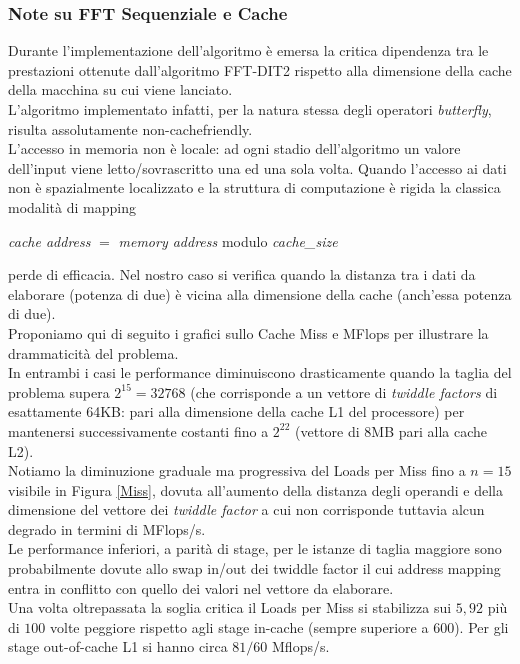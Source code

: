 \documentclass[12pt,a4paper,oneside,openright]{article}
\begin{document}
\subsubsection{Note su FFT Sequenziale e Cache}
Durante l'implementazione dell'algoritmo è emersa la critica dipendenza tra le prestazioni ottenute dall'algoritmo FFT-DIT2 rispetto alla dimensione della cache della macchina su cui viene lanciato.\\
L'algoritmo implementato infatti, per la natura stessa degli operatori \emph{butterfly}, risulta assolutamente non-cachefriendly.\\
L'accesso in memoria non è locale: ad ogni stadio dell'algoritmo un valore dell'input viene letto/sovrascritto una ed una sola volta. Quando l'accesso ai dati non è spazialmente localizzato e la struttura di computazione è rigida la classica modalità di mapping
\begin{center}
\emph{cache address} $=$ \emph{memory address} modulo \emph{cache\_size} 
\end{center}
perde di efficacia. Nel nostro caso si verifica quando la distanza tra i dati da elaborare (potenza di due) è vicina alla dimensione della cache (anch'essa potenza di due).\\
Proponiamo qui di seguito i grafici sullo Cache Miss e MFlops per illustrare la drammaticità del problema.\\
In entrambi i casi le performance diminuiscono drasticamente quando la taglia del problema supera $2^{15}=32768$ (che corrisponde a un vettore di \emph{twiddle factors} di esattamente 64KB: pari alla dimensione della cache L1 del processore) per mantenersi successivamente costanti fino a $2^{22}$ (vettore di 8MB pari alla cache L2).\\ Notiamo la diminuzione graduale ma progressiva del Loads per Miss fino a  $n=15$ visibile in Figura \ref{Miss}, dovuta all'aumento della distanza degli operandi e della dimensione del vettore dei \emph{twiddle factor} a cui non corrisponde tuttavia alcun degrado in termini di MFlops/s. \\Le performance inferiori, a parità di stage, per le istanze di taglia maggiore sono probabilmente dovute allo swap in/out dei twiddle factor il cui address mapping entra in conflitto con quello dei valori nel vettore da elaborare.\\
Una volta oltrepassata la soglia critica il Loads per Miss si stabilizza sui $5,92$ più di $100$ volte peggiore rispetto agli stage in-cache (sempre superiore a 600). 
Per gli stage out-of-cache L1 si hanno circa $81/60$ Mflops/s.
\end{document}
